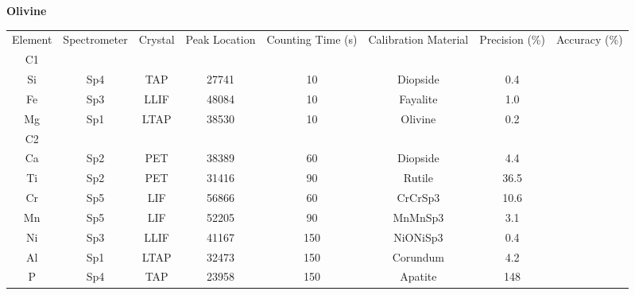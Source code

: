 \documentclass[draft]{agujournal2019}
\begin{document}
\begin{table}[!htbp]
\begin{subtable}[h]{1\textwidth}
\centering
\textbf{Olivine} \\ 
\vspace{5pt}
\begin{adjustbox}{width=1\textwidth, center=1\textwidth}
\begin{tabular}{c c c c c c c c}
\hline 
\multirow{3}{*}{Element} & \multirow{3}{*}{Spectrometer} & \multirow{3}{*}{Crystal} & \multirow{3}{*}{Peak Location} & \multirow{3}{2cm}{\centering Counting Time (s)}  & \multirow{3}{2cm}{\centering Calibration Material} & \multirow{3}{*}{Precision (\%)} & \multirow{3}{*}{Accuracy (\%)}\\ 
\\ 
\\
\hline
C1 &  &  &  &  &  & & \\
Si & Sp4 & TAP & 27741 & 10 & Diopside & 0.4&  \\
Fe & Sp3 & LLIF & 48084 & 10 & Fayalite & 1.0 &  \\
Mg & Sp1 & LTAP & 38530 & 10 & Olivine & 0.2 &  \\
C2 &  &  &  &  &  & & \\
Ca & Sp2 & PET & 38389 & 60 & Diopside & 4.4 &  \\
Ti & Sp2 & PET & 31416 & 90 & Rutile & 36.5 &  \\
Cr & Sp5 & LIF & 56866 & 60 & CrCrSp3 & 10.6 &  \\
Mn & Sp5 & LIF & 52205 & 90 & MnMnSp3 & 3.1 &  \\
Ni & Sp3 & LLIF & 41167 & 150 & NiONiSp3 & 0.4 &  \\
Al & Sp1 & LTAP & 32473 & 150 & Corundum & 4.2 &  \\
P & Sp4 & TAP & 23958 & 150 & Apatite & 148 &  \\
\hline 
\end{tabular}
\end{adjustbox}
\vspace{3pt}
\end{subtable}

\end{table}



\end{document}

